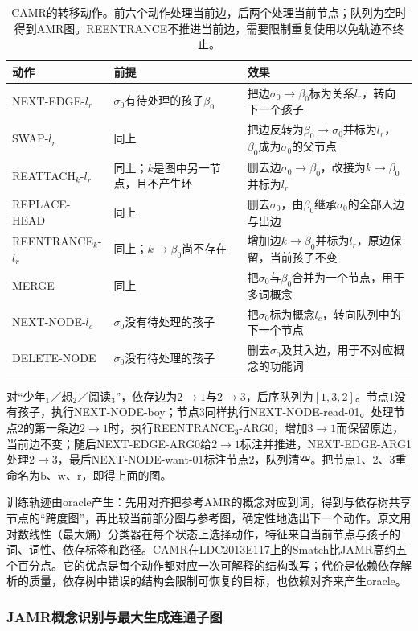 \begin{table}[htbp]
  \centering
  \begin{tabularx}{\linewidth}{@{}l X X@{}}
    \toprule
    动作&前提&效果\\
    \midrule
    NEXT-EDGE-$l_r$&$\sigma_0$有待处理的孩子$\beta_0$&把边$\sigma_0\to\beta_0$标为关系$l_r$，转向下一个孩子\\
    SWAP-$l_r$&同上&把边反转为$\beta_0\to\sigma_0$并标为$l_r$，$\beta_0$成为$\sigma_0$的父节点\\
    REATTACH$_k$-$l_r$&同上；$k$是图中另一节点，且不产生环&删去边$\sigma_0\to\beta_0$，改接为$k\to\beta_0$并标为$l_r$\\
    REPLACE-HEAD&同上&删去$\sigma_0$，由$\beta_0$继承$\sigma_0$的全部入边与出边\\
    REENTRANCE$_k$-$l_r$&同上；$k\to\beta_0$尚不存在&增加边$k\to\beta_0$并标为$l_r$，原边保留，当前孩子不变\\
    MERGE&同上&把$\sigma_0$与$\beta_0$合并为一个节点，用于多词概念\\
    NEXT-NODE-$l_c$&$\sigma_0$没有待处理的孩子&把$\sigma_0$标为概念$l_c$，转向队列中的下一个节点\\
    DELETE-NODE&$\sigma_0$没有待处理的孩子&删去$\sigma_0$及其入边，用于不对应概念的功能词\\
    \bottomrule
  \end{tabularx}
  \caption{CAMR的转移动作。前六个动作处理当前边，后两个处理当前节点；队列为空时得到AMR图。REENTRANCE不推进当前边，需要限制重复使用以免轨迹不终止。}
  \label{tab:nlp-analysis-camr-actions}
\end{table}

对“少年$_1$／想$_2$／阅读$_3$”，依存边为$2\to1$与$2\to3$，后序队列为$[1,3,2]$。节点1没有孩子，执行NEXT-NODE-boy；节点3同样执行NEXT-NODE-read-01。处理节点2的第一条边$2\to1$时，执行REENTRANCE$_3$-ARG0，增加$3\to1$而保留原边，当前边不变；随后NEXT-EDGE-ARG0给$2\to1$标注并推进，NEXT-EDGE-ARG1处理$2\to3$，最后NEXT-NODE-want-01标注节点2，队列清空。把节点1、2、3重命名为b、w、r，即得上面的图。

训练轨迹由oracle产生：先用对齐把参考AMR的概念对应到词，得到与依存树共享节点的“跨度图”，再比较当前部分图与参考图，确定性地选出下一个动作。原文用对数线性（最大熵）分类器在每个状态上选择动作，特征来自当前节点与孩子的词、词性、依存标签和路径。CAMR在LDC2013E117上的Smatch比JAMR高约五个百分点。它的优点是每个动作都对应一次可解释的结构改写；代价是依赖依存解析的质量，依存树中错误的结构会限制可恢复的目标，也依赖对齐来产生oracle。

\subsubsection{JAMR概念识别与最大生成连通子图}
\label{sec:nlp-analysis-amr-node-edge}

